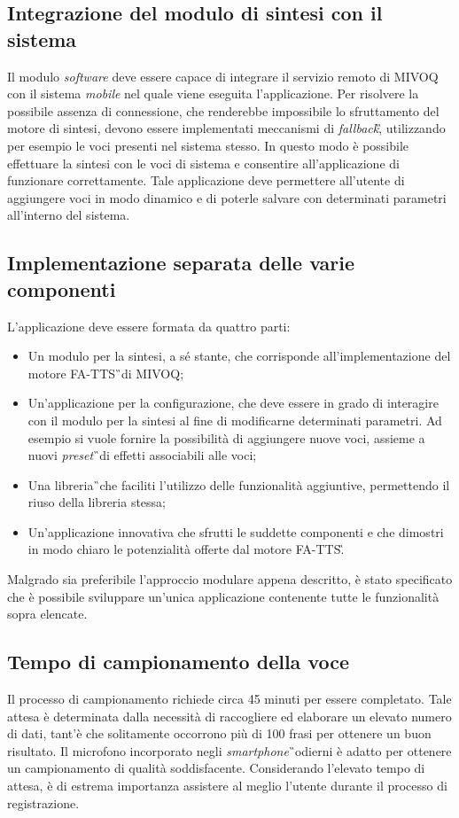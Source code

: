 \subsection{Integrazione del modulo di sintesi con il sistema}
Il modulo \textit{software} deve essere capace di integrare il servizio remoto di MIVOQ 
con il sistema \textit{mobile} nel quale viene eseguita l'applicazione. Per 
risolvere la possibile assenza di connessione, che renderebbe impossibile lo 
sfruttamento del motore di sintesi, devono essere implementati meccanismi di 
\textit{fallback}\G, utilizzando per esempio le voci presenti nel sistema stesso. In questo 
modo è possibile effettuare la sintesi con le voci di sistema e consentire 
all'applicazione di funzionare correttamente. Tale applicazione deve permettere 
all'utente di aggiungere voci in modo dinamico e di poterle salvare con 
determinati parametri all'interno del sistema.

\subsection{Implementazione separata delle varie componenti}
L'applicazione deve essere formata da quattro parti:
\begin{itemize}
	\item Un modulo per la sintesi, a sé stante, che corrisponde 
	all'implementazione del motore FA-TTS\G\ di MIVOQ;
	\item Un'applicazione per la configurazione, che deve essere in grado di 
	interagire con il modulo per la sintesi al fine di modificarne determinati 
	parametri. Ad esempio si vuole fornire la possibilità di aggiungere nuove 
	voci, assieme a nuovi \textit{preset}\G\ di effetti associabili alle voci;
	\item Una libreria\G\ che faciliti l'utilizzo delle funzionalità 
	aggiuntive, permettendo il riuso della libreria stessa;
	\item Un'applicazione innovativa che sfrutti le suddette componenti e che dimostri in modo chiaro le potenzialità offerte dal motore FA-TTS\G.
\end{itemize}
Malgrado sia preferibile l'approccio modulare appena descritto, è stato specificato che è possibile sviluppare un'unica applicazione contenente tutte le funzionalità sopra elencate. 

\subsection{Tempo di campionamento della voce}
Il processo di campionamento richiede circa 45 minuti per essere completato. Tale attesa è determinata dalla necessità di raccogliere ed elaborare un elevato numero di dati, tant'è che solitamente occorrono più di 100 frasi per ottenere un buon risultato. Il microfono incorporato negli \textit{smartphone}\G\ odierni è adatto per ottenere un campionamento di qualità soddisfacente. Considerando l'elevato tempo di attesa, è di estrema importanza  assistere al meglio l'utente durante il processo di registrazione.

